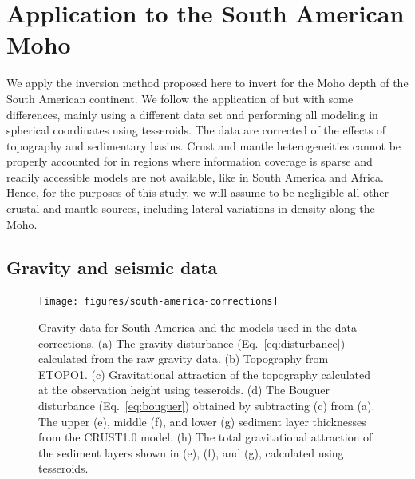 \documentclass[extra]{gji}
\begin{document}
\section{Application to the South American Moho}


We apply the inversion method proposed here to invert for the Moho depth of the
South American continent.
We follow the application of \citet{vandermeijde2013} but with some
differences, mainly using a different data set and performing all modeling
in spherical coordinates using tesseroids.
The data are corrected of the effects of topography and sedimentary basins.
Crust and mantle heterogeneities cannot be properly accounted for
in regions where information coverage is sparse and readily accessible models
are not available, like in South America and Africa.
Hence, for the purposes of this study, we will assume to be negligible all
other crustal and mantle sources, including lateral variations in density along
the Moho.


\subsection{Gravity and seismic data}

\begin{figure}
    \centering
    \texttt{[image: figures/south-america-corrections]}
    \caption{
        Gravity data for South America and the models used in the data
        corrections.
        (a) The gravity disturbance (Eq.~\ref{eq:disturbance}) calculated from
        the raw gravity data.
        (b) Topography from ETOPO1.
        (c) Gravitational attraction of the topography calculated
        at the observation height using tesseroids.
        (d) The Bouguer disturbance (Eq.~\ref{eq:bouguer}) obtained by
        subtracting (c) from (a).
        The upper (e), middle (f), and lower (g) sediment layer thicknesses
        from the CRUST1.0 model.
        (h) The total gravitational attraction of the sediment layers shown in
        (e), (f), and (g), calculated using tesseroids.
        }
    \label{fig:sam-corrections}
\end{figure}
\end{document}
